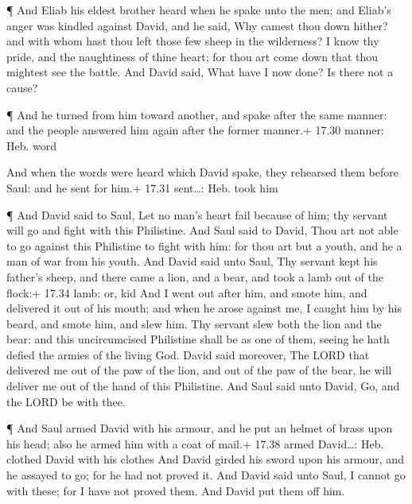  ¶ And Eliab his eldest brother heard when he spake unto
the men; and Eliab's anger was kindled against David, and he said, Why
camest thou down hither? and with whom hast thou left those few sheep in
the wilderness? I know thy pride, and the naughtiness of thine heart;
for thou art come down that thou mightest see the battle. 
And David said, What have I now done? Is there not a cause?

 ¶ And he turned from him toward another, and spake after
the same manner: and the people answered him again after the former
manner.+ 17.30 manner: Heb. word

 And when the words were heard which David spake, they
rehearsed them before Saul: and he sent for him.+ 17.31 sent\ldots: Heb.
took him

 ¶ And David said to Saul, Let no man's heart fail because
of him; thy servant will go and fight with this Philistine.
 And Saul said to David, Thou art not able to go against
this Philistine to fight with him: for thou art but a youth, and he a
man of war from his youth.  And David said unto Saul, Thy
servant kept his father's sheep, and there came a lion, and a bear, and
took a lamb out of the flock:+ 17.34 lamb: or, kid  And I
went out after him, and smote him, and delivered it out of his mouth:
and when he arose against me, I caught him by his beard, and smote him,
and slew him.  Thy servant slew both the lion and the bear:
and this uncircumcised Philistine shall be as one of them, seeing he
hath defied the armies of the living God.  David said
moreover, The LORD that delivered me out of the paw of the lion, and out
of the paw of the bear, he will deliver me out of the hand of this
Philistine. And Saul said unto David, Go, and the LORD be with thee.

 ¶ And Saul armed David with his armour, and he put an
helmet of brass upon his head; also he armed him with a coat of mail.+
17.38 armed David\ldots: Heb. clothed David with his clothes
 And David girded his sword upon his armour, and he assayed
to go; for he had not proved it. And David said unto Saul, I cannot go
with these; for I have not proved them. And David put them off him.

